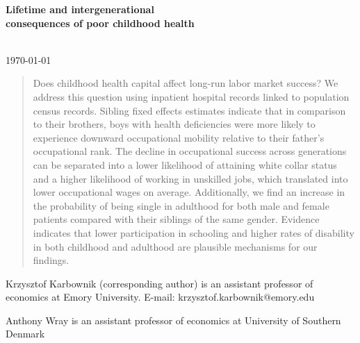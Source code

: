 \documentclass[12pt,english]{article}
\begin{document}

\begin{titlepage}
\vspace*{-2cm}
\begin{center}
\textbf{\noindent\singlespacing\Large Lifetime and intergenerational \\ consequences of poor childhood health}
\end{center}
\vspace{-0.25cm}
\begin{center}
    \\
    \vspace{0.25cm}
    {\large{\today}}
\end{center}
\vspace{-0.25cm}
\begin{abstract}
\begin{normalsize}
\begin{singlespace}
\noindent Does childhood health capital affect long-run labor market success? We address this question using inpatient hospital records linked to population census records. Sibling fixed effects estimates indicate that in comparison to their brothers, boys with health deficiencies were more likely to experience downward occupational mobility relative to their father's occupational rank. The decline in occupational success across generations can be separated into a lower likelihood of attaining white collar status and a higher likelihood of working in unskilled jobs, which translated into lower occupational wages on average. Additionally, we find an increase in the probability of being single in adulthood for both male and female patients compared with their siblings of the same gender. Evidence indicates that lower participation in schooling and higher rates of disability in both childhood and adulthood are plausible mechanisms for our findings.
\end{singlespace}
\end{normalsize}
\end{abstract}

\begin{singlespace}
\noindent Krzysztof Karbownik (corresponding author) is an assistant professor of economics at Emory University. E-mail: krzysztof.karbownik@emory.edu

\noindent Anthony Wray is an assistant professor of economics at University of Southern Denmark


\end{singlespace}
\end{titlepage}
\end{document}
